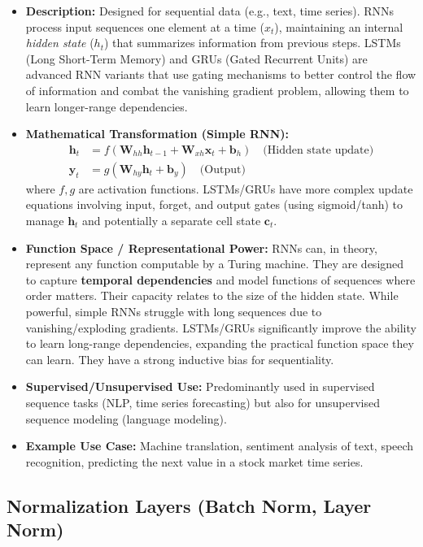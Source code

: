 \documentclass{article}
\newcommand{\bW}{\bm{W}}
\newcommand{\bb}{\bm{b}}
\newcommand{\bx}{\bm{x}}
\newcommand{\by}{\bm{y}}
\newcommand{\bh}{\bm{h}}
\newcommand{\bc}{\bm{c}}
\begin{document}
\begin{itemize}
    \item \textbf{Description:} Designed for sequential data (e.g., text, time series). RNNs process input sequences one element at a time ($x_t$), maintaining an internal \emph{hidden state} ($h_t$) that summarizes information from previous steps. LSTMs (Long Short-Term Memory) and GRUs (Gated Recurrent Units) are advanced RNN variants that use gating mechanisms to better control the flow of information and combat the vanishing gradient problem, allowing them to learn longer-range dependencies.
    \item \textbf{Mathematical Transformation (Simple RNN):}
        \begin{align}
            \bh_t &= f(\bW_{hh}\bh_{t-1} + \bW_{xh}\bx_t + \bb_h) \quad \text{(Hidden state update)} \\
            \by_t &= g(\bW_{hy}\bh_t + \bb_y) \quad \text{(Output)}
        \end{align}
        where $f, g$ are activation functions. LSTMs/GRUs have more complex update equations involving input, forget, and output gates (using sigmoid/tanh) to manage $\bh_t$ and potentially a separate cell state $\bc_t$.
    \item \textbf{Function Space / Representational Power:} RNNs can, in theory, represent any function computable by a Turing machine. They are designed to capture \textbf{temporal dependencies} and model functions of sequences where order matters. Their capacity relates to the size of the hidden state. While powerful, simple RNNs struggle with long sequences due to vanishing/exploding gradients. LSTMs/GRUs significantly improve the ability to learn long-range dependencies, expanding the practical function space they can learn. They have a strong inductive bias for sequentiality.
    \item \textbf{Supervised/Unsupervised Use:} Predominantly used in supervised sequence tasks (NLP, time series forecasting) but also for unsupervised sequence modeling (language modeling).
    \item \textbf{Example Use Case:} Machine translation, sentiment analysis of text, speech recognition, predicting the next value in a stock market time series.
\end{itemize}

\subsection{Normalization Layers (Batch Norm, Layer Norm)}
\end{document}
